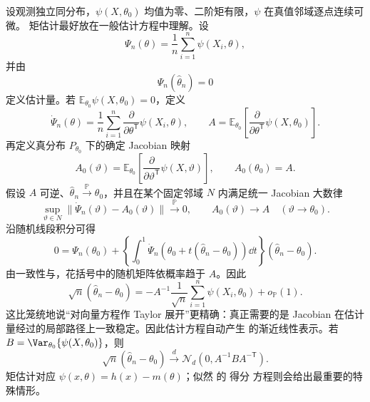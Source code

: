 \begin{theorem}[估计方程的渐近线性表示]
设观测独立同分布，$\psi(X,\theta_0)$ 均值为零、二阶矩有限，$\psi$ 在真值邻域逐点连续可微。
矩估计最好放在一般估计方程中理解。设
\[
 \Psi_n(\theta)
 =\frac1n\sum_{i=1}^n\psi(X_i,\theta),
\]
并由
\begin{equation*}\Psi_n(\widehat\theta_n)=0
\end{equation*}
定义估计量。若 $\mathbb E_{\theta_0}\psi(X,\theta_0)=0$，定义
\[
 \dot\Psi_n(\theta)
 =\frac1n\sum_{i=1}^n
 \frac{\partial}{\partial\theta^{\mathsf T}}
 \psi(X_i,\theta),
 \qquad
 A
 =\mathbb E_{\theta_0}\!\left[
 \frac{\partial}{\partial\theta^{\mathsf T}}
 \psi(X,\theta_0)
 \right].
\]
再定义真分布 $P_{\theta_0}$ 下的确定 Jacobian 映射
\[
 A_0(\vartheta)
 =\mathbb E_{\theta_0}\!\left[
 \frac{\partial}{\partial\vartheta^{\mathsf T}}
 \psi(X,\vartheta)
 \right],
 \qquad
 A_0(\theta_0)=A.
\]
假设 $A$ 可逆、$\widehat\theta_n\xrightarrow{\mathbb P}\theta_0$，并且在某个固定邻域 $N$ 内满足统一 Jacobian 大数律
\begin{equation}\label{eq:math-stat-estimating-jacobian-uniform}
 \sup_{\vartheta\in N}
 \|\dot\Psi_n(\vartheta)-A_0(\vartheta)\|\xrightarrow{\mathbb P}0,
 \qquad
 A_0(\vartheta)\to A
 \quad(\vartheta\to\theta_0).
\end{equation}
沿随机线段积分可得
\[
 0=\Psi_n(\theta_0)
 +\left\{
 \int_0^1
 \dot\Psi_n\!\left(
 \theta_0+t(\widehat\theta_n-\theta_0)
 \right)\dd t
 \right\}
 (\widehat\theta_n-\theta_0).
\]
由一致性与，花括号中的随机矩阵依概率趋于 $A$。因此
\begin{equation*}\sqrt n(\widehat\theta_n-\theta_0)
 =-A^{-1}\frac1{\sqrt n}
 \sum_{i=1}^n\psi(X_i,\theta_0)
 +o_{\mathbb P}(1).
\end{equation*}
这比笼统地说“对向量方程作 Taylor 展开”更精确：真正需要的是 Jacobian 在估计量经过的局部路径上一致稳定。因此估计方程自动产生  的渐近线性表示。若 $B=\Var_{\theta_0}\{\psi(X,\theta_0)\}$，则
\[
 \sqrt n(\widehat\theta_n-\theta_0)
 \xrightarrow{d}\mathcal N_d(0,A^{-1}BA^{-\mathsf T}).
\]
矩估计对应 $\psi(x,\theta)=h(x)-m(\theta)$；似然 的 得分 方程则会给出最重要的特殊情形。
\end{theorem}

